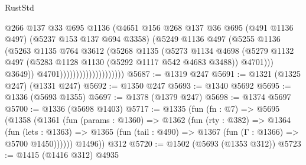 \begin{lexlean}{RustStd}
\begin{coremodule}
                                        @266
                                        @137
                                        @33
                                        @695
                                        @1136
                                        (@4651
                                          @156
                                          @268
                                          @137
                                          @36
                                          @695
                                          (@491 @1136 @497)
                                          (@5237 @153 @137 @694 @3358)
                                          (@5249
                                            @1136
                                            @497
                                            (@5255
                                              @1136
                                              (@5263
                                                @1135
                                                @764
                                                @3612
                                                (@5268
                                                  @1135
                                                  (@5273
                                                    @1134
                                                    @4698
                                                    (@5279
                                                      @1132
                                                      @497
                                                      (@5283
                                                        @1128
                                                        @1130
                                                        (@5292 @1117 @542 @4683 @3488))
                                                      @4701)))
                                                @3649))
                                            @4701))))))))))))))))))))
@5687 := @1319 @247
@5691 := @1321 (@1325 @247) (@1331 @247)
@5692 := @1350 @247
@5693 := @1340 @5692
@5695 := @1336 (@5693 @1355)
@5697 := @1378 (@1379 @247)
@5698 := @1374 @5697
@5700 := @1336 (@5698 @1403)
@5717 := @1335
    (fun (fn : @7) =>
    @5695
      (@1358
        (@1361
          (fun (params : @1360) =>
          @1362
            (fun (rty : @382) =>
            @1364
              (fun (lets : @1363) =>
              @1365 (fun (tail : @490) => @1367 (fun (Γ : @1366) => @5700 @1450))))))
        @1496))
    @312
@5720 := @1502 (@5693 (@1353 @312))
@5723 := @1415 (@1416 @312) @4935

\end{coremodule}
\end{lexlean}

